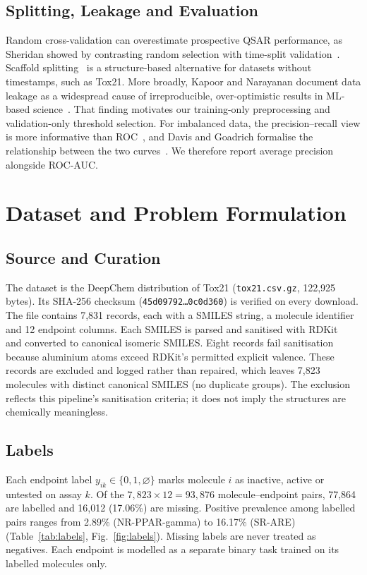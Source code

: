 \documentclass[conference]{IEEEtran}
\begin{document}
\subsection{Splitting, Leakage and Evaluation}
Random cross-validation can overestimate prospective QSAR performance, as Sheridan showed by contrasting random selection with time-split validation~\cite{sheridan2013time}. Scaffold splitting~\cite{bemis1996frameworks,wu2018moleculenet} is a structure-based alternative for datasets without timestamps, such as Tox21. More broadly, Kapoor and Narayanan document data leakage as a widespread cause of irreproducible, over-optimistic results in ML-based science~\cite{kapoor2023leakage}. That finding motivates our training-only preprocessing and validation-only threshold selection. For imbalanced data, the precision--recall view is more informative than ROC~\cite{saito2015precision}, and Davis and Goadrich formalise the relationship between the two curves~\cite{davis2006relationship}. We therefore report average precision alongside ROC-AUC.

\section{Dataset and Problem Formulation}
\subsection{Source and Curation}
The dataset is the DeepChem distribution of Tox21 (\texttt{tox21.csv.gz}, 122,925 bytes). Its SHA-256 checksum (\texttt{45d09792\ldots0c0d360}) is verified on every download. The file contains 7,831 records, each with a SMILES string, a molecule identifier and 12 endpoint columns. Each SMILES is parsed and sanitised with RDKit~\cite{rdkit} and converted to canonical isomeric SMILES. Eight records fail sanitisation because aluminium atoms exceed RDKit's permitted explicit valence. These records are excluded and logged rather than repaired, which leaves 7,823 molecules with distinct canonical SMILES (no duplicate groups). The exclusion reflects this pipeline's sanitisation criteria; it does not imply the structures are chemically meaningless.

\subsection{Labels}
Each endpoint label $y_{ik}\in\{0,1,\varnothing\}$ marks molecule $i$ as inactive, active or untested on assay $k$. Of the $7{,}823\times12=93{,}876$ molecule--endpoint pairs, 77,864 are labelled and 16,012 (17.06\%) are missing. Positive prevalence among labelled pairs ranges from 2.89\% (NR-PPAR-gamma) to 16.17\% (SR-ARE) (Table~\ref{tab:labels}, Fig.~\ref{fig:labels}). Missing labels are never treated as negatives. Each endpoint is modelled as a separate binary task trained on its labelled molecules only.
\end{document}
